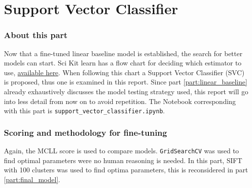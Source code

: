 \part{Support Vector Classifier}
\label{part:svc}


\section{About this part}
\label{section:SVC_about_part}

Now that a fine-tuned linear baseline model is established, the search for better models can start.
Sci Kit learn has a flow chart for deciding which estimator to use, \href{https://scikit-learn.org/stable/tutorial/machine_learning_map/index.html}{available here}.
When following this chart a Support Vector Classifier (SVC) is proposed, thus one is examined in this report.
Since part \ref{part:linear_baseline} already exhaustively discusses the model testing strategy used, this report will go into less detail from now on to avoid repetition. 
The Notebook corresponding with this part is \texttt{support\_vector\_classifier.ipynb}.



\section{Scoring and methodology for fine-tuning}
\label{section:SVC_methodology}

Again, the MCLL score is used to compare models.
\texttt{GridSearchCV} was used to find optimal parameters were no human reasoning is needed. 
In this part, SIFT with 100 clusters was used to find optima parameters, this is reconsidered in part \ref{part:final_model}.

